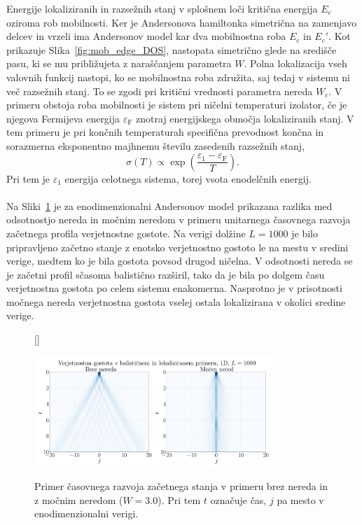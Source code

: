  Energije lokaliziranih in razsežnih stanj v splošnem loči kritična energija $E_c$ oziroma rob mobilnosti. Ker je Andersonova hamiltonka simetrična na zamenjavo delcev in vrzeli ima Andersonov model kar dva mobilnostna roba $E_c$ in $E_c'$. Kot prikazuje Slika~\ref{fig:mob_edge_DOS}, nastopata simetrično glede na središče pasu, ki se mu približujeta z naraščanjem parametra $W$. Polna lokalizacija vseh valovnih funkcij nastopi, ko se mobilnostna roba združita, saj tedaj v sistemu ni več razsežnih stanj. To se zgodi pri kritični vrednosti parametra nereda $W_c$. V primeru obstoja roba mobilnosti je sistem pri ničelni temperaturi izolator, če je njegova Fermijeva energija $\varepsilon_\mathrm{F}$ znotraj energijskega območja lokaliziranih stanj. V tem primeru je pri končnih temperaturah specifična prevodnost končna in sorazmerna eksponentno majhnemu številu zasedenih razsežnih stanj,
\begin{equation}
\sigma(T)\propto \exp\left(\frac{\varepsilon_1 - \varepsilon_\mathrm{F}}{T}\right).
\end{equation}
Pri tem je $\varepsilon_1$ energija celotnega sistema, torej vsota enodelčnih energij.  \\\\
Na Sliki~\ref{fig:light_cone} je za enodimenzionalni Andersonov model prikazana razlika med odsotnostjo nereda in močnim neredom v primeru unitarnega časovnega razvoja začetnega profila verjetnostne gostote. Na verigi dolžine $L=1000$ je bilo pripravljeno začetno stanje z enotsko verjetnostno gostoto le na mestu v sredini verige, medtem ko je bila gostota povsod drugod ničelna. V odsotnosti nereda se je začetni profil sčasoma balistično razširil, tako da je bila po dolgem času verjetnostna gostota po celem sistemu enakomerna. Nasprotno je v prisotnosti močnega nereda verjetnostna gostota vselej ostala lokalizirana v okolici sredine verige. 
\begin{figure}[H]
[\FBwidth]
{\caption{Primer časovnega razvoja začetnega stanja v primeru brez nereda in z močnim neredom ($W=3.0$). Pri tem $t$ označuje čas, $j$ pa mesto v enodimenzionalni verigi. }\label{fig:light_cone}}
{\includegraphics[width=0.8\textwidth]{1D_Anderson_localization_Seminar_scaling_analysis_D1_shape_1000_light_cone_double_presentation.pdf}}
\end{figure} 
